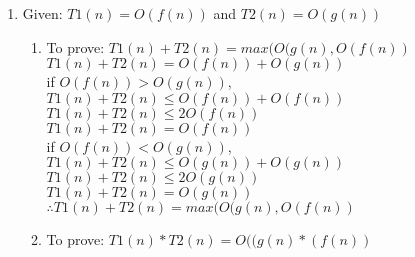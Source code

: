 \documentclass[12pt, a4paper]{article}
\begin{document}
\begin{enumerate}[label=(\alph*)]
	
	
	\item Given: $T1(n) = O(f(n))$ and $T 2(n) = O(g(n))$\\
	 	\begin{enumerate}[label=(\alph*)]
	 		\item
	 		To prove: $T1(n) + T2(n) =
	 		max(O(g(n), O(f(n))$\\
	 		
	 		
	 		
	 		$ T1(n)+T2(n) = O(f(n)) + O(g(n))$\\
	 		
	 		if $O(f(n)) > O(g(n))$, \\
	 		$T1(n)+T2(n) \leq O(f(n)) + O(f(n))$\\
	 		$T1(n)+T2(n) \leq 2O(f(n))$\\
	 		$T1(n)+T2(n) = O(f(n))$\\
	 		
	 		if $O(f(n)) < O(g(n))$, \\
	 		$T1(n)+T2(n) \leq O(g(n)) + O(g(n))$\\
	 		$T1(n)+T2(n) \leq 2O(g(n))$\\
	 		$T1(n)+T2(n) = O(g(n))$\\
	 		
	 		$\therefore T1(n) + T2(n) =
	 		max(O(g(n), O(f(n))$\\
	 		
	 		\item 
	 		To prove: $T1(n) * T2(n) =
	 		O((g(n)*(f(n))$\\
	 		

\end{enumerate}
\end{enumerate}
\end{document}
